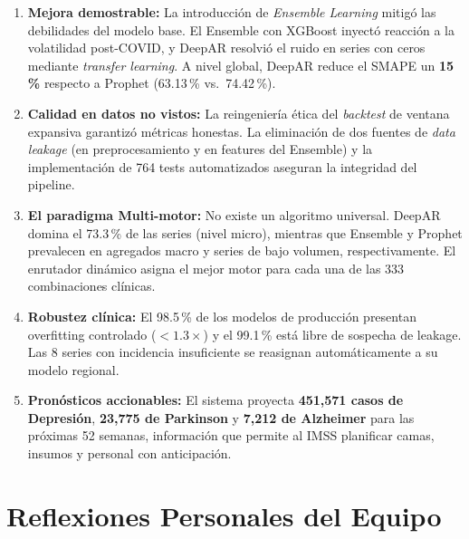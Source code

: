 \documentclass[12pt, letterpaper]{article}
\begin{document}
\begin{enumerate}
    \item \textbf{Mejora demostrable:} La introducción de \textit{Ensemble Learning} mitigó las debilidades del modelo base. El Ensemble con XGBoost inyectó reacción a la volatilidad post-COVID, y DeepAR resolvió el ruido en series con ceros mediante \textit{transfer learning}. A nivel global, DeepAR reduce el SMAPE un \textbf{15\,\%} respecto a Prophet (63.13\,\% vs.\ 74.42\,\%).

    \item \textbf{Calidad en datos no vistos:} La reingeniería ética del \textit{backtest} de ventana expansiva garantizó métricas honestas. La eliminación de dos fuentes de \textit{data leakage} (en preprocesamiento y en features del Ensemble) y la implementación de 764 tests automatizados aseguran la integridad del pipeline.

    \item \textbf{El paradigma Multi-motor:} No existe un algoritmo universal. DeepAR domina el 73.3\,\% de las series (nivel micro), mientras que Ensemble y Prophet prevalecen en agregados macro y series de bajo volumen, respectivamente. El enrutador dinámico asigna el mejor motor para cada una de las 333 combinaciones clínicas.

    \item \textbf{Robustez clínica:} El 98.5\,\% de los modelos de producción presentan overfitting controlado ($<1.3\times$) y el 99.1\,\% está libre de sospecha de leakage. Las 8 series con incidencia insuficiente se reasignan automáticamente a su modelo regional.

    \item \textbf{Pronósticos accionables:} El sistema proyecta \textbf{451,571 casos de Depresión}, \textbf{23,775 de Parkinson} y \textbf{7,212 de Alzheimer} para las próximas 52 semanas, información que permite al IMSS planificar camas, insumos y personal con anticipación.
\end{enumerate}

\newpage

\section{Reflexiones Personales del Equipo}\label{sec:reflexiones}
\end{document}
